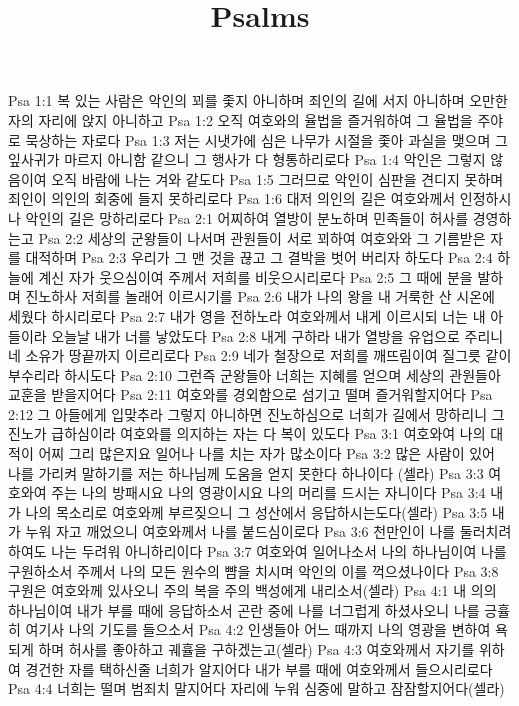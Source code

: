 

\title{Psalms}

Psa 1:1  복 있는 사람은 악인의 꾀를 좇지 아니하며 죄인의 길에 서지 아니하며 오만한 자의 자리에 앉지 아니하고
Psa 1:2  오직 여호와의 율법을 즐거워하여 그 율법을 주야로 묵상하는 자로다
Psa 1:3  저는 시냇가에 심은 나무가 시절을 좇아 과실을 맺으며 그 잎사귀가 마르지 아니함 같으니 그 행사가 다 형통하리로다
Psa 1:4  악인은 그렇지 않음이여 오직 바람에 나는 겨와 같도다
Psa 1:5  그러므로 악인이 심판을 견디지 못하며 죄인이 의인의 회중에 들지 못하리로다
Psa 1:6  대저 의인의 길은 여호와께서 인정하시나 악인의 길은 망하리로다
Psa 2:1  어찌하여 열방이 분노하며 민족들이 허사를 경영하는고
Psa 2:2  세상의 군왕들이 나서며 관원들이 서로 꾀하여 여호와와 그 기름받은 자를 대적하며
Psa 2:3  우리가 그 맨 것을 끊고 그 결박을 벗어 버리자 하도다
Psa 2:4  하늘에 계신 자가 웃으심이여 주께서 저희를 비웃으시리로다
Psa 2:5  그 때에 분을 발하며 진노하사 저희를 놀래어 이르시기를
Psa 2:6  내가 나의 왕을 내 거룩한 산 시온에 세웠다 하시리로다
Psa 2:7  내가 영을 전하노라 여호와께서 내게 이르시되 너는 내 아들이라 오늘날 내가 너를 낳았도다
Psa 2:8  내게 구하라 내가 열방을 유업으로 주리니 네 소유가 땅끝까지 이르리로다
Psa 2:9  네가 철장으로 저희를 깨뜨림이여 질그릇 같이 부수리라 하시도다
Psa 2:10  그런즉 군왕들아 너희는 지혜를 얻으며 세상의 관원들아 교훈을 받을지어다
Psa 2:11  여호와를 경외함으로 섬기고 떨며 즐거워할지어다
Psa 2:12  그 아들에게 입맞추라 그렇지 아니하면 진노하심으로 너희가 길에서 망하리니 그 진노가 급하심이라 여호와를 의지하는 자는 다 복이 있도다
Psa 3:1  여호와여 나의 대적이 어찌 그리 많은지요 일어나 나를 치는 자가 많소이다
Psa 3:2  많은 사람이 있어 나를 가리켜 말하기를 저는 하나님께 도움을 얻지 못한다 하나이다 (셀라)
Psa 3:3  여호와여 주는 나의 방패시요 나의 영광이시요 나의 머리를 드시는 자니이다
Psa 3:4  내가 나의 목소리로 여호와께 부르짖으니 그 성산에서 응답하시는도다(셀라)
Psa 3:5  내가 누워 자고 깨었으니 여호와께서 나를 붙드심이로다
Psa 3:6  천만인이 나를 둘러치려 하여도 나는 두려워 아니하리이다
Psa 3:7  여호와여 일어나소서 나의 하나님이여 나를 구원하소서 주께서 나의 모든 원수의 뺨을 치시며 악인의 이를 꺽으셨나이다
Psa 3:8  구원은 여호와께 있사오니 주의 복을 주의 백성에게 내리소서(셀라)
Psa 4:1  내 의의 하나님이여 내가 부를 때에 응답하소서 곤란 중에 나를 너그럽게 하셨사오니 나를 긍휼히 여기사 나의 기도를 들으소서
Psa 4:2  인생들아 어느 때까지 나의 영광을 변하여 욕되게 하며 허사를 좋아하고 궤휼을 구하겠는고(셀라)
Psa 4:3  여호와께서 자기를 위하여 경건한 자를 택하신줄 너희가 알지어다 내가 부를 때에 여호와께서 들으시리로다
Psa 4:4  너희는 떨며 범죄치 말지어다 자리에 누워 심중에 말하고 잠잠할지어다(셀라)
